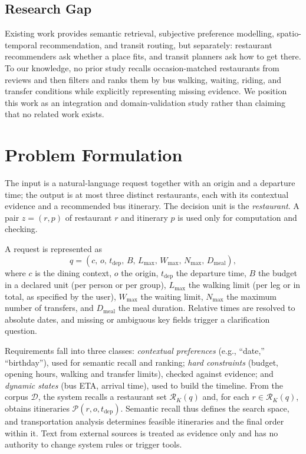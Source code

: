 \documentclass[conference]{IEEEtran}
\begin{document}
\subsection{Research Gap}
Existing work provides semantic retrieval, subjective preference modelling, spatio-temporal recommendation, and transit routing, but separately: restaurant recommenders ask whether a place fits, and transit planners ask how to get there. To our knowledge, no prior study recalls occasion-matched restaurants from reviews and then filters and ranks them by bus walking, waiting, riding, and transfer conditions while explicitly representing missing evidence. We position this work as an integration and domain-validation study rather than claiming that no related work exists.

\section{Problem Formulation}\label{sec:problem}

The input is a natural-language request together with an origin and a departure time; the output is at most three distinct restaurants, each with its contextual evidence and a recommended bus itinerary. The decision unit is the \emph{restaurant}. A pair $z=(r,p)$ of restaurant $r$ and itinerary $p$ is used only for computation and checking.

A request is represented as
\begin{equation}
q=(c,\,o,\,t_{\mathrm{dep}},\,B,\,L_{\max},\,W_{\max},\,N_{\max},\,D_{\mathrm{meal}}),
\end{equation}
where $c$ is the dining context, $o$ the origin, $t_{\mathrm{dep}}$ the departure time, $B$ the budget in a declared unit (per person or per group), $L_{\max}$ the walking limit (per leg or in total, as specified by the user), $W_{\max}$ the waiting limit, $N_{\max}$ the maximum number of transfers, and $D_{\mathrm{meal}}$ the meal duration. Relative times are resolved to absolute dates, and missing or ambiguous key fields trigger a clarification question.

Requirements fall into three classes: \emph{contextual preferences} (e.g., ``date,'' ``birthday''), used for semantic recall and ranking; \emph{hard constraints} (budget, opening hours, walking and transfer limits), checked against evidence; and \emph{dynamic states} (bus ETA, arrival time), used to build the timeline. From the corpus $\mathcal{D}$, the system recalls a restaurant set $\mathcal{R}_K(q)$ and, for each $r\in\mathcal{R}_K(q)$, obtains itineraries $\mathcal{P}(r,o,t_{\mathrm{dep}})$. Semantic recall thus defines the search space, and transportation analysis determines feasible itineraries and the final order within it. Text from external sources is treated as evidence only and has no authority to change system rules or trigger tools.
\end{document}
